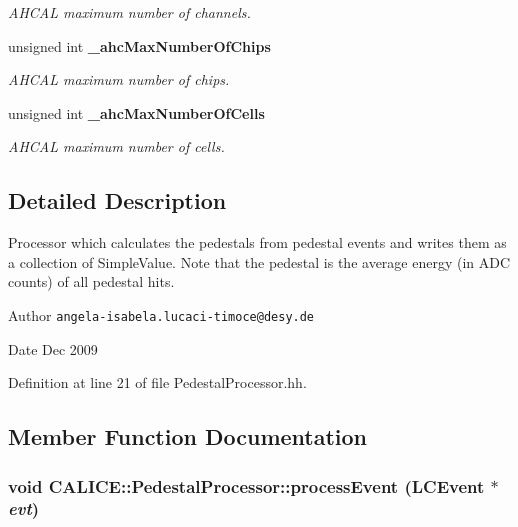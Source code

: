 \begin{DoxyCompactItemize}
\begin{DoxyCompactList}\small\item\em AHCAL maximum number of channels. \item\end{DoxyCompactList}\item 
unsigned int {\bf \_\-ahcMaxNumberOfChips}\label{classCALICE_1_1PedestalProcessor_ab39bcf808bee762e209218547e4e8e3b}

\begin{DoxyCompactList}\small\item\em AHCAL maximum number of chips. \item\end{DoxyCompactList}\item 
unsigned int {\bf \_\-ahcMaxNumberOfCells}\label{classCALICE_1_1PedestalProcessor_ab6b7f92f8127ddf820ce1463f4870457}

\begin{DoxyCompactList}\small\item\em AHCAL maximum number of cells. \item\end{DoxyCompactList}\end{DoxyCompactItemize}


\subsection{Detailed Description}
Processor which calculates the pedestals from pedestal events and writes them as a collection of SimpleValue. Note that the pedestal is the average energy (in ADC counts) of all pedestal hits. \begin{DoxyAuthor}{Author}
{\tt angela-\/isabela.lucaci-\/timoce@desy.de} 
\end{DoxyAuthor}
\begin{DoxyDate}{Date}
Dec 2009 
\end{DoxyDate}


Definition at line 21 of file PedestalProcessor.hh.

\subsection{Member Function Documentation}
\subsubsection[{processEvent}]{\setlength{\rightskip}{0pt plus 5cm}void CALICE::PedestalProcessor::processEvent (LCEvent $\ast$ {\em evt})}\label{classCALICE_1_1PedestalProcessor_a38b604fcbf248fd117ad099d080e4b9f}


